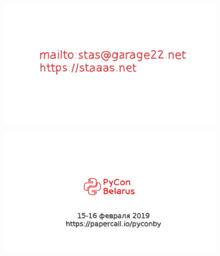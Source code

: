 \documentclass[10pt,pdf,utf8,aspectratio=169,xcolor=dvipsnames,x11names,center]{beamer}
\begin{document}
\begin{frame}
  \begin{figure}
    \includegraphics[scale=0.88]{Slides-06-contacts}
  \end{figure}
\end{frame}

\begin{frame}
  \begin{figure}
    \includegraphics[scale=0.88]{Slides-07-pycon}
  \end{figure}
\end{frame}
\end{document}
